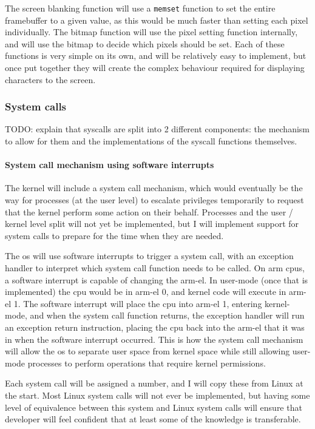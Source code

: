 \documentclass{article}
\begin{document}
The screen blanking function will use a \texttt{memset} function to set the
entire framebuffer to a given value, as this would be much faster than setting
each pixel individually. The bitmap function will use the pixel setting
function internally, and will use the bitmap to decide which pixels should be
set. Each of these functions is very simple on its own, and will be relatively
easy to implement, but once put together they will create the complex behaviour
required for displaying characters to the screen.

\subsubsection{System calls}
TODO: explain that syscalls are split into 2 different components: the
mechanism to allow for them and the implementations of the syscall functions
themselves.

\paragraph{System call mechanism using software interrupts}
The kernel will include a system call mechanism, which would eventually be the
way for processes (at the user level) to escalate privileges temporarily to
request that the kernel perform some action on their behalf. Processes and the
user / kernel level split will not yet be implemented, but I will implement
support for system calls to prepare for the time when they are needed.

The \gls{os} will use software interrupts to trigger a system call, with an
exception handler to interpret which system call function needs to be called.
On \gls{arm} \glspl{cpu}, a software interrupt is capable of changing the
\gls{arm-el}. In user-mode (once that is implemented) the \gls{cpu} would be in
\gls{arm-el} 0, and kernel code will execute in \gls{arm-el} 1. The software
interrupt will place the \gls{cpu} into \gls{arm-el} 1, entering kernel-mode,
and when the system call function returns, the exception handler will run an
exception return instruction, placing the \gls{cpu} back into the \gls{arm-el}
that it was in when the software interrupt occurred. This is how the system
call mechanism will allow the \gls{os} to separate user space from kernel space
while still allowing user-mode processes to perform operations that require
kernel permissions.

Each system call will be assigned a number, and I will copy these from Linux at
the start. Most Linux system calls will not ever be implemented, but having
some level of equivalence between this system and Linux system calls will
ensure that developer will feel confident that at least some of the knowledge
is transferable.
\end{document}
